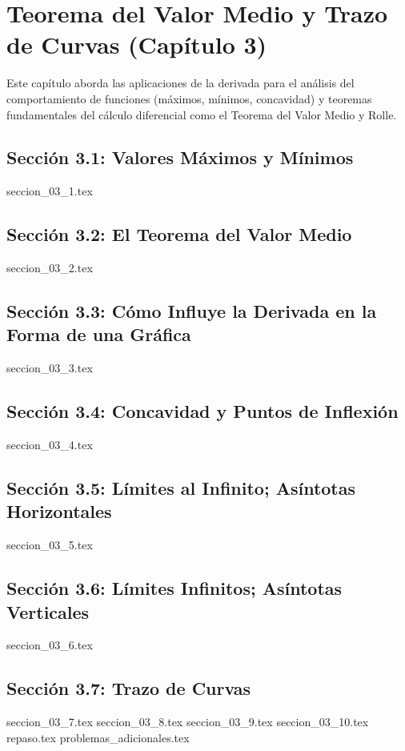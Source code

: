 \chapter{Teorema del Valor Medio y Trazo de Curvas (Capítulo 3)}
\label{cap:aplicaciones_de_la_derivada}

Este capítulo aborda las aplicaciones de la derivada para el análisis del comportamiento de funciones (máximos, mínimos, concavidad) y teoremas fundamentales del cálculo diferencial como el Teorema del Valor Medio y Rolle.

\section{Sección 3.1: Valores Máximos y Mínimos}
{seccion_03_1.tex}

\section{Sección 3.2: El Teorema del Valor Medio}
{seccion_03_2.tex}

\section{Sección 3.3: Cómo Influye la Derivada en la Forma de una Gráfica}
{seccion_03_3.tex}

\section{Sección 3.4: Concavidad y Puntos de Inflexión}
{seccion_03_4.tex}

\section{Sección 3.5: Límites al Infinito; Asíntotas Horizontales}
{seccion_03_5.tex}

\section{Sección 3.6: Límites Infinitos; Asíntotas Verticales}
{seccion_03_6.tex}

\section{Sección 3.7: Trazo de Curvas}
{seccion_03_7.tex}
{seccion_03_8.tex}
{seccion_03_9.tex}
{seccion_03_10.tex}
{repaso.tex}
{problemas_adicionales.tex}
